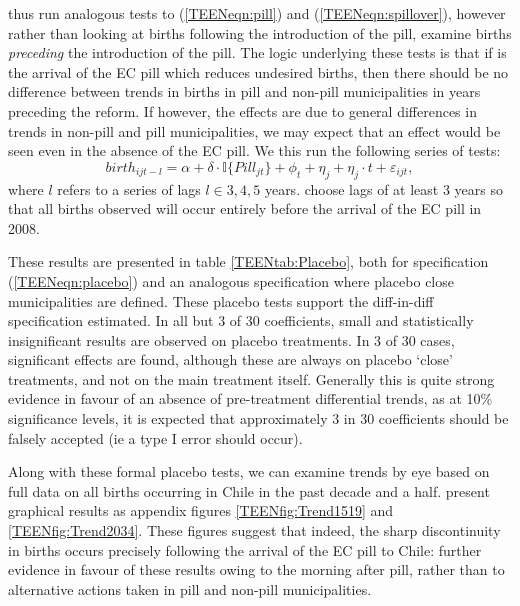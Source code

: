 \Person thus run analogous tests to (\ref{TEENeqn:pill}) and 
(\ref{TEENeqn:spillover}), however rather than looking at births following the
introduction of the pill, \person examine births \emph{preceding} the introduction
of the pill.  The logic underlying these tests is that if is the arrival of the EC 
pill which reduces undesired births, then there should be no difference between 
trends in births in pill and non-pill municipalities in years preceding the reform.  
If however, the effects are due to general differences in trends in non-pill and 
pill municipalities, we may expect that an effect would be seen even in the 
absence of the EC pill.  We this run the following series of tests:
\begin{equation}
 \label{TEENeqn:placebo}
birth_{ijt-l} = \alpha + \delta\cdot \mathbb{I}\{Pill_{jt}\} + \phi_t + \eta_j + 
\eta_j\cdot t + \varepsilon_{ijt},
\end{equation}
where $l$ refers to a series of lags $l\in 3,4,5$ years.  \Person choose lags of
at least 3 years so that all births observed will occur entirely before the 
arrival of the EC pill in 2008.

These results are presented in table \ref{TEENtab:Placebo}, both for 
specification (\ref{TEENeqn:placebo}) and an analogous specification where 
placebo close municipalities are defined.  These placebo tests support the 
diff-in-diff specification estimated.  In all but 3 of 30 coefficients, small
and statistically insignificant results are observed on placebo treatments.  In
3 of 30 cases, significant effects are found, although these are always on 
placebo `close' treatments, and not on the main treatment itself.  Generally
this is quite strong evidence in favour of an absence of pre-treatment 
differential trends, as at 10\% significance levels, it is expected that 
approximately 3 in 30 coefficients should be falsely accepted (ie a type I error
should occur).

Along with these formal placebo tests, we can examine trends by eye based on
full data on all births occurring in Chile in the past decade and a half. \Person 
present graphical results as appendix figures \ref{TEENfig:Trend1519} and 
\ref{TEENfig:Trend2034}.  These figures suggest that indeed, the sharp 
discontinuity in births occurs precisely following the arrival of the EC pill 
to Chile: further evidence in favour of these results owing to the morning after 
pill, rather than to alternative actions taken in pill and non-pill 
municipalities.

